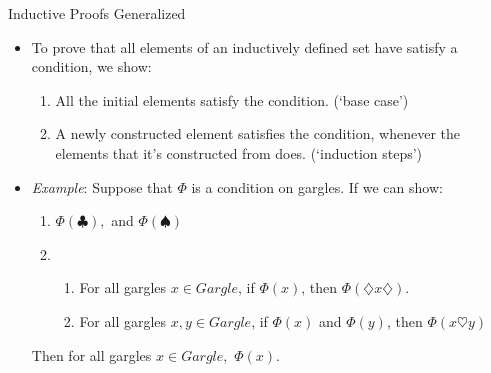 \documentclass[../slides.tex]{subfiles}
\begin{document}
\begin{frame}{Inductive Proofs Generalized}

	\begin{itemize}
	
		\item To prove that all elements of an inductively defined set have satisfy a condition, we show:
		
		\begin{enumerate}[1.]
			
			\item All the initial elements satisfy the condition. (`base case')
			
			\item A newly constructed element satisfies the condition, whenever the elements that it's constructed from does. (`induction steps')
		
		\end{enumerate}
		
		\item \emph{Example}: Suppose that $\Phi$ is a condition on gargles. If we can show:
			\begin{enumerate}
			
				\item $\Phi(\clubsuit),$ and $\Phi(\spadesuit)$
				
				\item \begin{enumerate}\item For all gargles $x\in Gargle$, if $\Phi(x)$, then $\Phi(\diamondsuit x\diamondsuit)$.
			
					\item  For all gargles $x,y\in Gargle$, if $\Phi(x)$ and $\Phi(y)$, then $\Phi(x\heartsuit y)$
					
					\end{enumerate}
			\end{enumerate}
			Then for all gargles $x\in Gargle,$ $\Phi(x)$.
	
	\end{itemize}

\end{frame}
\end{document}
